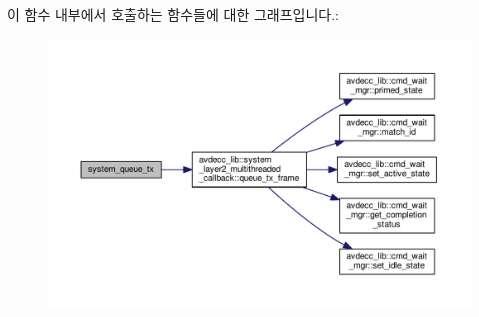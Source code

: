 이 함수 내부에서 호출하는 함수들에 대한 그래프입니다.\+:
\nopagebreak
\begin{figure}[H]
\begin{center}
\leavevmode
\includegraphics[width=350pt]{namespaceavdecc__lib_a6dd511685627c0865a3442b539a4e8e9_cgraph}
\end{center}
\end{figure}





